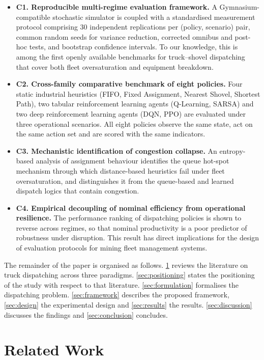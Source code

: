 \documentclass[11pt,a4paper]{article}
\begin{document}
\begin{itemize}
  \item \textbf{C1. Reproducible multi-regime evaluation framework.} A Gymnasium-compatible stochastic simulator is coupled with a standardised measurement protocol comprising 30 independent replications per (policy, scenario) pair, common random seeds for variance reduction, corrected omnibus and post-hoc tests, and bootstrap confidence intervals. To our knowledge, this is among the first openly available benchmarks for truck--shovel dispatching that cover both fleet oversaturation and equipment breakdown.

  \item \textbf{C2. Cross-family comparative benchmark of eight policies.} Four static industrial heuristics (FIFO, Fixed Assignment, Nearest Shovel, Shortest Path), two tabular reinforcement learning agents (Q-Learning, SARSA) and two deep reinforcement learning agents (DQN, PPO) are evaluated under three operational scenarios. All eight policies observe the same state, act on the same action set and are scored with the same indicators.

  \item \textbf{C3. Mechanistic identification of congestion collapse.} An entropy-based analysis of assignment behaviour identifies the queue hot-spot mechanism through which distance-based heuristics fail under fleet oversaturation, and distinguishes it from the queue-based and learned dispatch logics that contain congestion.

  \item \textbf{C4. Empirical decoupling of nominal efficiency from operational resilience.} The performance ranking of dispatching policies is shown to reverse across regimes, so that nominal productivity is a poor predictor of robustness under disruption. This result has direct implications for the design of evaluation protocols for mining fleet management systems.
\end{itemize}

The remainder of the paper is organised as follows. \cref{sec:relwork} reviews the literature on truck dispatching across three paradigms. \cref{sec:positioning} states the positioning of the study with respect to that literature. \cref{sec:formulation} formalises the dispatching problem. \cref{sec:framework} describes the proposed framework, \cref{sec:design} the experimental design and \cref{sec:results} the results. \cref{sec:discussion} discusses the findings and \cref{sec:conclusion} concludes.
\section{Related Work}
\label{sec:relwork}
\end{document}

